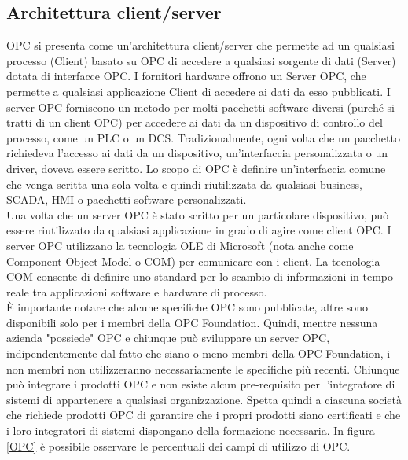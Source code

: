 \documentclass[12pt, a4paper, oneside]{book}
\begin{document}
\subsection{Architettura client/server}
OPC si presenta come un’architettura client/server che permette ad un qualsiasi processo (Client) basato su OPC di accedere a qualsiasi sorgente di dati (Server) dotata di interfacce OPC. I fornitori hardware offrono un Server OPC, che permette a qualsiasi applicazione Client di accedere ai dati da esso pubblicati. I server OPC forniscono un metodo per molti pacchetti software diversi (purché si tratti di un client OPC) per accedere ai dati da un dispositivo di controllo del processo, come un PLC o un DCS. Tradizionalmente, ogni volta che un pacchetto richiedeva l'accesso ai dati da un dispositivo, un'interfaccia personalizzata o un driver, doveva essere scritto. Lo scopo di OPC è definire un'interfaccia comune che venga scritta una sola volta e quindi riutilizzata da qualsiasi business, SCADA, HMI o pacchetti software personalizzati.
\\Una volta che un server OPC è stato scritto per un particolare dispositivo, può essere riutilizzato da qualsiasi applicazione in grado di agire come client OPC. I server OPC utilizzano la tecnologia OLE di Microsoft (nota anche come Component Object Model o COM) per comunicare con i client. La tecnologia COM consente di definire uno standard per lo scambio di informazioni in tempo reale tra applicazioni software e hardware di processo.
\\È importante notare che alcune specifiche OPC sono pubblicate, altre sono disponibili solo per i membri della OPC Foundation. Quindi, mentre nessuna azienda "possiede" OPC e chiunque può sviluppare un server OPC, indipendentemente dal fatto che siano o meno membri della OPC Foundation, i non membri non utilizzeranno necessariamente le specifiche più recenti. Chiunque può integrare i prodotti OPC e non esiste alcun pre-requisito per l'integratore di sistemi di appartenere a qualsiasi organizzazione. Spetta quindi a ciascuna società che richiede prodotti OPC di garantire che i propri prodotti siano certificati e che i loro integratori di sistemi dispongano della formazione necessaria.
In figura \ref{OPC} è possibile osservare le percentuali dei campi di utilizzo di OPC.
\end{document}
